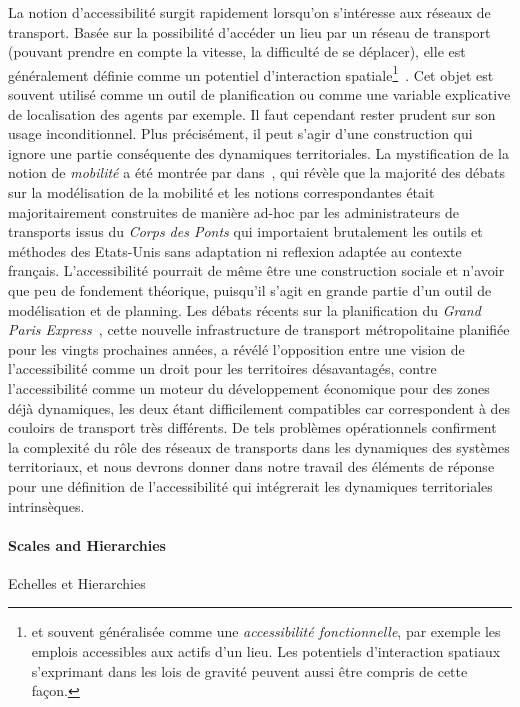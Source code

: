 {La notion d'accessibilité surgit rapidement lorsqu'on s'intéresse aux réseaux de transport. Basée sur la possibilité d'accéder un lieu par un réseau de transport (pouvant prendre en compte la vitesse, la difficulté de se déplacer), elle est généralement définie comme un potentiel d'interaction spatiale\footnote{et souvent généralisée comme une \emph{accessibilité fonctionnelle}, par exemple les emplois accessibles aux actifs d'un lieu. Les potentiels d'interaction spatiaux s'exprimant dans les lois de gravité peuvent aussi être compris de cette façon.}~\cite{bavoux2005geographie}. Cet objet est souvent utilisé comme un outil de planification ou comme une variable explicative de localisation des agents par exemple. Il faut cependant rester prudent sur son usage inconditionnel. Plus précisément, il peut s'agir d'une construction qui ignore une partie conséquente des dynamiques territoriales. La mystification de la notion de \emph{mobilité} a été montrée par  dans~\cite{commenges:tel-00923682}, qui révèle que la majorité des débats sur la modélisation de la mobilité et les notions correspondantes était majoritairement construites de manière ad-hoc par les administrateurs de transports issus du \emph{Corps des Ponts} qui importaient brutalement les outils et méthodes des Etats-Unis sans adaptation ni reflexion adaptée au contexte français. L'accessibilité pourrait de même être une construction sociale et n'avoir que peu de fondement théorique, puisqu'il s'agit en grande partie d'un outil de modélisation et de planning. Les débats récents sur la planification du \emph{Grand Paris Express}~\cite{confMangin}, cette nouvelle infrastructure de transport métropolitaine planifiée pour les vingts prochaines années, a révélé l'opposition entre une vision de l'accessibilité comme un droit pour les territoires désavantagés, contre l'accessibilité comme un moteur du développement économique pour des zones déjà dynamiques, les deux étant difficilement compatibles car correspondent à des couloirs de transport très différents. De tels problèmes opérationnels confirment la complexité du rôle des réseaux de transports dans les dynamiques des systèmes territoriaux, et nous devrons donner dans notre travail des éléments de réponse pour une définition de l'accessibilité qui intégrerait les dynamiques territoriales intrinsèques.
}

\paragraph{Scales and Hierarchies}{Echelles et Hierarchies}


